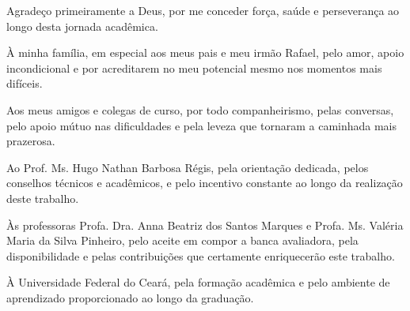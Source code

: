 
Agradeço primeiramente a Deus, por me conceder força, saúde e perseverança ao longo desta jornada acadêmica.

À minha família, em especial aos meus pais e meu irmão Rafael, pelo amor, apoio incondicional e por acreditarem no meu potencial mesmo nos momentos mais difíceis.

Aos meus amigos e colegas de curso, por todo companheirismo, pelas conversas, pelo apoio mútuo nas dificuldades e pela leveza que tornaram a caminhada mais prazerosa.

Ao Prof. Ms. Hugo Nathan Barbosa Régis, pela orientação dedicada, pelos conselhos técnicos e acadêmicos, e pelo incentivo constante ao longo da realização deste trabalho.

Às professoras Profa. Dra. Anna Beatriz dos Santos Marques e Profa. Ms. Valéria Maria da Silva Pinheiro, pelo aceite em compor a banca avaliadora, pela disponibilidade e pelas contribuições que certamente enriquecerão este trabalho.

À Universidade Federal do Ceará, pela formação acadêmica e pelo ambiente de aprendizado proporcionado ao longo da graduação.